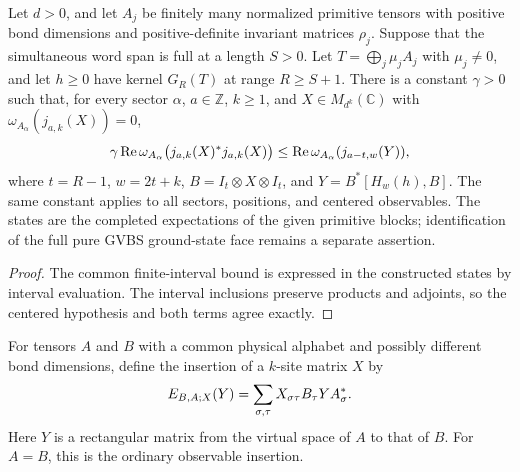 \begin{lemma}
    \label{thm:multiblock_quasi_local_parent_commutator_gap}
    \leanok
    Let $d>0$, and let $A_j$ be finitely many normalized primitive tensors
    with positive bond dimensions and positive-definite invariant matrices
    $\rho_j$. Suppose that the simultaneous word span is full at a length
    $S>0$. Let $T=\bigoplus_j\mu_jA_j$ with $\mu_j\neq0$, and let $h\geq0$
    have kernel $G_R(T)$ at range $R\geq S+1$.
    There is a constant $\gamma>0$ such that, for every sector $\alpha$,
    $a\in\mathbb Z$, $k\geq1$, and $X\in M_{d^k}(\mathbb C)$
    with $\omega_{A_\alpha}(j_{a,k}(X))=0$,
    \begin{align}
        \gamma\operatorname{Re}\omega_{A_\alpha}
        \bigl(j_{a,k}(X)^*j_{a,k}(X)\bigr)
        \leq\operatorname{Re}\omega_{A_\alpha}(j_{a-t,w}(Y)),
        \notag
    \end{align}
    where $t=R-1$, $w=2t+k$, $B=I_t\otimes X\otimes I_t$, and
    $Y=B^*[H_w(h),B]$. The same constant applies to all sectors,
    positions, and centered observables. The states are the completed
    expectations of the given primitive blocks; identification of the full
    pure GVBS ground-state face remains a separate assertion.
\end{lemma}
\begin{proof}\leanok
    The common finite-interval bound is expressed in the constructed states
    by interval evaluation. The interval inclusions preserve products and
    adjoints, so the centered hypothesis and both terms agree exactly.
\end{proof}

\begin{definition}
    \label{def:mixed_observable_insertion}
    \leanok
    For tensors $A$ and $B$ with a common physical alphabet and possibly different
    bond dimensions, define the insertion of a $k$-site matrix $X$ by
    \begin{align}
        E_{B,A;X}(Y)=\sum_{\sigma,\tau}X_{\sigma\tau}B_\tau Y A_\sigma^*.
        \notag
    \end{align}
    Here $Y$ is a rectangular matrix from the virtual space of $A$ to that of $B$.
    For $A=B$, this is the ordinary observable insertion.
\end{definition}

